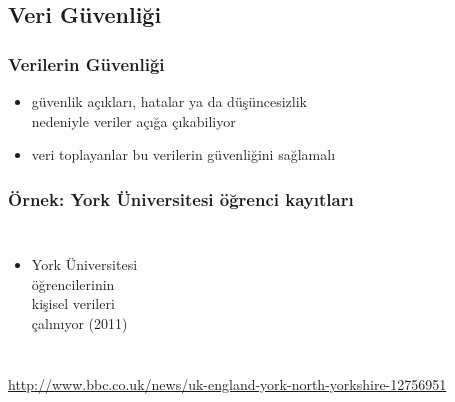 \documentclass[dvipsnames]{beamer}
\theoremstyle{plain}
\begin{document}
\subsection{Veri Güvenliği}

\begin{frame}
  \frametitle{Verilerin Güvenliği}

  \begin{itemize}
    \item güvenlik açıkları, hatalar ya da düşüncesizlik\\
      nedeniyle veriler açığa çıkabiliyor
    \item veri toplayanlar bu verilerin güvenliğini sağlamalı
  \end{itemize}
\end{frame}

\begin{frame}
  \frametitle{Örnek: York Üniversitesi öğrenci kayıtları}

  \begin{columns}

    \begin{itemize}
      \item York Üniversitesi\\
        öğrencilerinin\\
        kişisel verileri\\
        çalınıyor (2011)
    \end{itemize}
  \end{columns}

  \medskip
  \tiny{\url{http://www.bbc.co.uk/news/uk-england-york-north-yorkshire-12756951}}\\
\end{frame}
\end{document}
